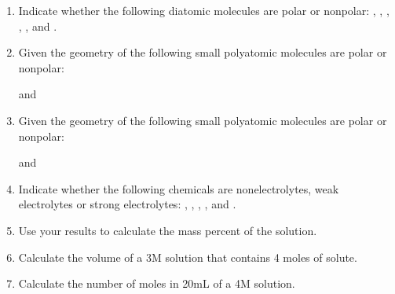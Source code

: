 \documentclass[main.tex]{subfiles}
\begin{document}
\begin{enumerate}
\item{} Indicate whether the following diatomic molecules are polar or nonpolar: , , , , , and .
\vspace{2.5cm}
\item{} Given the geometry of the following small polyatomic molecules are polar or nonpolar:\\
\begin{center} \hspace{.05in}\hspace{.1in} and  \hspace{.1in}\hspace{.07in} \end{center}
\vspace{2.5cm}

\item{} Given the geometry of the following small polyatomic molecules are polar or nonpolar: \\


\begin{center} \hspace{.05in}\hspace{.05in}\hspace{.05in}\hspace{.05in} and \hspace{.05in}\hspace{.05in} \end{center}
\vspace{2.5cm}

\item{} Indicate whether the following chemicals are nonelectrolytes, weak electrolytes or strong electrolytes: , ,  , , and .
\vspace{2.5cm}
 
\item  Use your results  to calculate the mass percent of the solution.
\vspace{2.5cm}
\item  Calculate the volume of a 3M solution that contains 4 moles of solute.
\vspace{2.5cm}
\item Calculate the number of moles in 20mL of a 4M solution. 
\vspace{2.5cm}
\end{enumerate}

 
\end{document}
